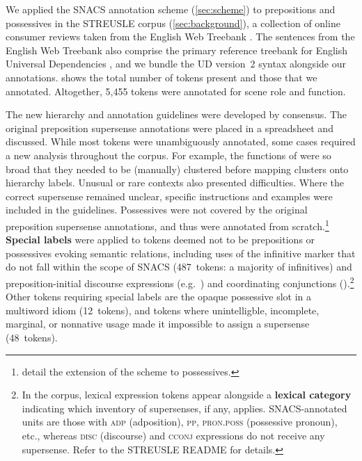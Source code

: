 \pdfoutput=1 \documentclass[11pt,a4paper]{article}
\newcommand{\shortversion}[1]{}
\newcommand{\longversion}[1]{#1} \newcommand{\subversion}[1]{#1} \newcommand{\draftnotice}[1]{} \newcommand{\anonversion}[1]{#1} \newcommand{\nonanonversion}[1]{}
\begin{document}
We applied the SNACS annotation scheme (\cref{sec:scheme}) to prepositions and possessives in the STREUSLE corpus (\cref{sec:background}), a collection of online consumer reviews taken from the English Web Treebank \citep{ewtb}. The sentences from the English Web Treebank also comprise the primary reference treebank for English Universal Dependencies \citep[UD;][]{nivre-16}, and we bundle the UD version~2 syntax alongside our annotations. 
 shows the total number of tokens present and those that we annotated. Altogether, 5,455 tokens were annotated for scene role and function. 





The new hierarchy and annotation guidelines were developed by consensus. The original preposition supersense annotations were placed in a spreadsheet and discussed. While most tokens were unambiguously annotated,  some cases required a new analysis throughout the corpus.
For example, the functions of  were so broad that they needed to be (manually) clustered 	before mapping clusters onto hierarchy labels. Unusual or rare contexts also presented difficulties. Where the correct supersense remained unclear, specific instructions and examples were included in the guidelines. Possessives were not covered by the original preposition supersense annotations, and thus were annotated from scratch.\footnote{ detail the extension of the scheme to possessives.}
\shortversion{Some tokens (marking discourse expressions, infinitives, idioms, etc.)\ were deemed not to be prepositions or possessives evoking semantic relations and were annotated with special labels.}\longversion{\textbf{Special labels} were applied to tokens deemed not to be prepositions or possessives evoking semantic relations, 
including uses of the infinitive marker that do not fall within the scope of SNACS (487~tokens: a majority of infinitives) and preposition-initial discourse expressions (e.g.~\pex{\p{after}\_all}) and coordinating conjunctions (\pex{\p{as}\_well\_as}).\footnote{In the corpus, lexical expression tokens appear alongside a \textbf{lexical category} indicating which inventory of supersenses, if any, applies. SNACS-annotated units are those with \textsc{adp} (adposition), \textsc{pp}, \textsc{pron.poss} (possessive pronoun), etc., 
whereas \textsc{disc} (discourse) and \textsc{cconj} expressions do not receive any supersense.
Refer to the STREUSLE README for details.} Other tokens requiring special labels are the opaque possessive slot in a multiword idiom (12~tokens), and tokens where unintelligble, incomplete, marginal, or nonnative usage made it impossible to assign a supersense (48~tokens).}
\end{document}

